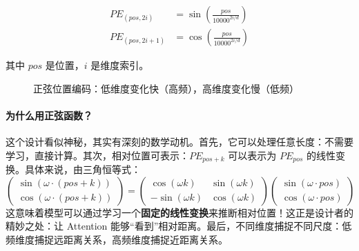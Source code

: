 \begin{align}
    PE_{(pos, 2i)} &= \sin\left(\frac{pos}{10000^{2i/d}}\right) \\
    PE_{(pos, 2i+1)} &= \cos\left(\frac{pos}{10000^{2i/d}}\right)
\end{align}

其中 $pos$ 是位置，$i$ 是维度索引。

\begin{figure}[htbp]
\centering
{}
\caption{正弦位置编码：低维度变化快（高频），高维度变化慢（低频）}
\end{figure}

\paragraph{为什么用正弦函数？}

这个设计看似神秘，其实有深刻的数学动机。首先，它可以处理任意长度：不需要学习，直接计算。其次，相对位置可表示：$PE_{pos+k}$ 可以表示为 $PE_{pos}$ 的线性变换。具体来说，由三角恒等式：
\[
\begin{pmatrix} \sin(\omega \cdot (pos+k)) \\ \cos(\omega \cdot (pos+k)) \end{pmatrix}
= \begin{pmatrix} \cos(\omega k) & \sin(\omega k) \\ -\sin(\omega k) & \cos(\omega k) \end{pmatrix}
\begin{pmatrix} \sin(\omega \cdot pos) \\ \cos(\omega \cdot pos) \end{pmatrix}
\]
这意味着模型可以通过学习一个\textbf{固定的线性变换}来推断相对位置！这正是设计者的精妙之处：让 Attention 能够“看到”相对距离。最后，不同维度捕捉不同尺度：低频维度捕捉远距离关系，高频维度捕捉近距离关系。



